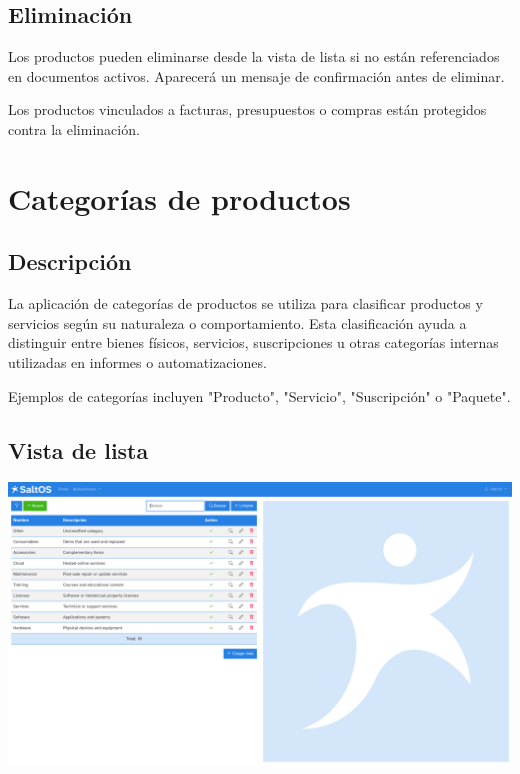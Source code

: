 \documentclass[a4paper]{article}
\begin{document}
\hypertarget{toc155}{}
\subsection{Eliminación}

Los productos pueden eliminarse desde la vista de lista si no están referenciados en documentos activos.
Aparecerá un mensaje de confirmación antes de eliminar.

Los productos vinculados a facturas, presupuestos o compras están protegidos contra la eliminación.


\hypertarget{toc156}{}
\section{Categorías de productos}

\hypertarget{toc157}{}
\subsection{Descripción}

La aplicación de categorías de productos se utiliza para clasificar productos y servicios según su naturaleza o comportamiento.
Esta clasificación ayuda a distinguir entre bienes físicos, servicios, suscripciones u otras categorías internas utilizadas en informes o automatizaciones.

Ejemplos de categorías incluyen "Producto", "Servicio", "Suscripción" o "Paquete".

\hypertarget{toc158}{}
\subsection{Vista de lista}

\begin{center}\includegraphics[width=1\textwidth]{../ujest/snaps/test-screenshots-js-screenshots-sales-products-categories-list-es-es-1-snap.png}\end{center}
\end{document}
